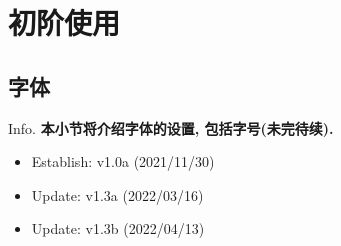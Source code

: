 \documentclass[hyperref, UTF8, CJK, aspectratio=169]{beamer}
\begin{document}


\section{初阶使用}
\subsection{字体}
\begin{frame}{Info.}
	\textbf{本小节将介绍字体的设置, 包括字号(未完待续).}
	\begin{multicols}{2}
		\begin{itemize}
			\item Establish: \textcolor{univgreen}{v1.0a (2021/11/30)}
			\item Update: \textcolor{univgreen}{v1.3a (2022/03/16)}
      \item Update: \textcolor{univgreen}{v1.3b (2022/04/13)}
		\end{itemize}
	\end{multicols}
	\mycopyright
\end{frame}
\end{document}
